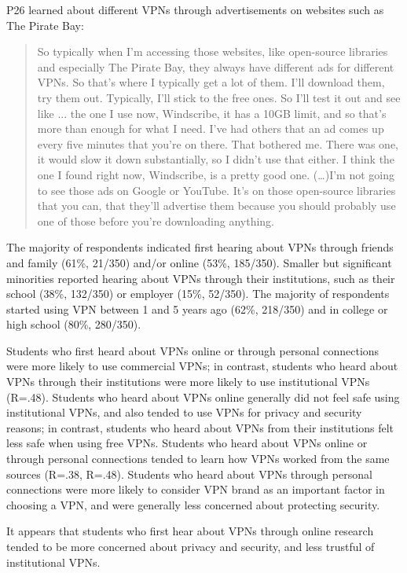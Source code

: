 P26 learned about different VPNs through advertisements on websites such as The Pirate Bay:
\begin{quote}So typically when I'm accessing those websites, like open-source libraries and especially The Pirate Bay, they always have different ads for different VPNs. So that's where I typically get a lot of them. I'll download them, try them out. Typically, I'll stick to the free ones. So I'll test it out and see like ... the one I use now, Windscribe, it has a 10GB limit, and so that's more than enough for what I need. I've had others that an ad comes up every five minutes that you're on there. That bothered me. There was one, it would slow it down substantially, so I didn't use that either. I think the one I found right now, Windscribe, is a pretty good one.
(\dots)I'm not going to see those ads on Google or YouTube. It's on those open-source libraries that you can, that they'll advertise them because you should probably use one of those before you're downloading anything.\end{quote}

The majority of respondents indicated first hearing about VPNs through friends and family (61\%, 21/350) and/or online (53\%, 185/350). Smaller but significant minorities reported hearing about VPNs through their institutions, such as their school (38\%, 132/350) or employer (15\%, 52/350). The majority of respondents started using VPN between 1 and 5 years ago (62\%, 218/350) and in college or high school (80\%, 280/350).

Students who first heard about VPNs online or through personal connections were more likely to use commercial VPNs; in contrast, students who heard about VPNs through their institutions were more likely to use institutional VPNs (R=.48). Students who heard about VPNs online generally did not feel safe using institutional VPNs, and also tended to use VPNs for privacy and security reasons; in contrast, students who heard about VPNs from their institutions felt less safe when using free VPNs. Students who heard about VPNs online or through personal connections tended to learn how VPNs worked from the same sources (R=.38, R=.48). Students who heard about VPNs through personal connections were more likely to consider VPN brand as an important factor in choosing a VPN, and were generally less concerned about protecting security.

It appears that students who first hear about VPNs through online research tended to be more concerned about privacy and security, and less trustful of institutional VPNs. 


